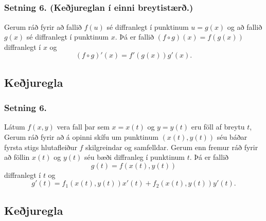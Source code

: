 \date{21.~janúar 2015}



\subsection{}
	\maketitle





\subsection{} 

\subsubsection{Setning 6. (Keðjureglan í einni breytistærð.)}
 Gerum ráð fyrir að fallið $f(u)$ sé diffranlegt í punktinum $u=g(x)$ og að fallið $g(x)$ sé diffranlegt í punktinum $x$.  Þá er fallið $(f\circ g)(x)=f(g(x))$ diffranlegt í $x$ og 
$$(f\circ g)'(x)=f'(g(x))g'(x).$$







\subsection{ Keðjuregla} 

\subsubsection{Setning 6.}
Látum $f(x,y)$ vera fall þar sem $x=x(t)$ og $y=y(t)$ eru föll af breytu $t$,  Gerum ráð fyrir að á opinni skífu um  punktinum $(x(t),y(t))$ séu báðar fyrsta stigs hlutafleiður $f$ skilgreindar og samfelldar.   Gerum enn fremur ráð fyrir að föllin $x(t)$ og $y(t)$ séu bæði diffranleg í punktinum $t$.  Þá er fallið 
$$g(t)=f(x(t),y(t))$$
diffranlegt í $t$ og 
$$g'(t)=f_1(x(t),y(t))x'(t)+f_2(x(t),y(t))y'(t).$$




\subsection{Keðjuregla} 

